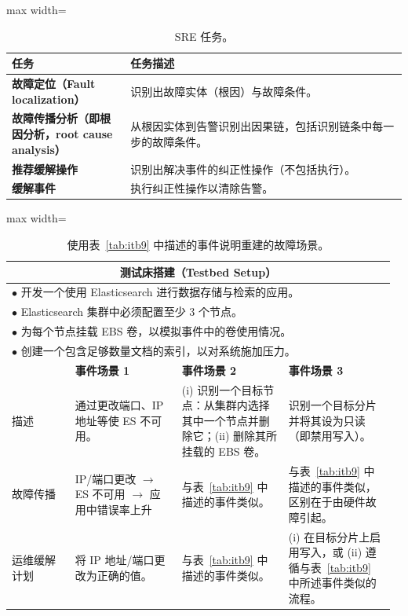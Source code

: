 \documentclass[10pt,UTF8,fontset=fandol]{ctexart}
\begin{document}
\begin{table}[H]
\centering
\caption{SRE 任务。}
\label{tab:itb10}
\begin{adjustbox}{max width=\linewidth}
\begin{tabular}{@{}p{0.30\linewidth} p{0.70\linewidth}@{}}
\toprule
\textbf{任务} & \textbf{任务描述} \\
\midrule
\textbf{故障定位（Fault localization）} & 识别出故障实体（根因）与故障条件。 \\
\addlinespace
\textbf{故障传播分析（即根因分析，root cause analysis）} & 从根因实体到告警识别出因果链，包括识别链条中每一步的故障条件。 \\
\addlinespace
\textbf{推荐缓解操作} & 识别出解决事件的纠正性操作（不包括执行）。 \\
\addlinespace
\textbf{缓解事件} & 执行纠正性操作以清除告警。 \\
\bottomrule
\end{tabular}
\end{adjustbox}
\end{table}

\begin{table}[H]
\centering
\caption{使用表~\ref{tab:itb9} 中描述的事件说明重建的故障场景。}
\label{tab:itb11}
\begin{adjustbox}{max width=\linewidth}
\begin{tabular}{@{}p{0.16\linewidth} p{0.27\linewidth} p{0.27\linewidth} p{0.27\linewidth}@{}}
\multicolumn{4}{c}{\textbf{测试床搭建（Testbed Setup）}} \\
\midrule
\multicolumn{4}{p{\linewidth}}{$\bullet$ 开发一个使用 Elasticsearch 进行数据存储与检索的应用。} \\
\multicolumn{4}{p{\linewidth}}{$\bullet$ Elasticsearch 集群中必须配置至少 3 个节点。} \\
\multicolumn{4}{p{\linewidth}}{$\bullet$ 为每个节点挂载 EBS 卷，以模拟事件中的卷使用情况。} \\
\multicolumn{4}{p{\linewidth}}{$\bullet$ 创建一个包含足够数量文档的索引，以对系统施加压力。} \\
\midrule
 & \textbf{事件场景 1} & \textbf{事件场景 2} & \textbf{事件场景 3} \\
\midrule
描述 & 通过更改端口、IP 地址等使 ES 不可用。 & (i) 识别一个目标节点：从集群内选择其中一个节点并删除它；(ii) 删除其所挂载的 EBS 卷。 & 识别一个目标分片并将其设为只读（即禁用写入）。 \\
\addlinespace
故障传播 & IP/端口更改 $\rightarrow$ ES 不可用 $\rightarrow$ 应用中错误率上升 & 与表~\ref{tab:itb9} 中描述的事件类似。 & 与表~\ref{tab:itb9} 中描述的事件类似，区别在于由硬件故障引起。 \\
\addlinespace
运维缓解计划 & 将 IP 地址/端口更改为正确的值。 & 与表~\ref{tab:itb9} 中描述的事件类似。 & (i) 在目标分片上启用写入，或 (ii) 遵循与表~\ref{tab:itb9} 中所述事件类似的流程。 \\
\bottomrule
\end{tabular}
\end{adjustbox}
\end{table}
\end{document}
